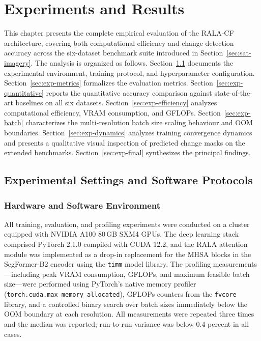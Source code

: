 \chapter{Experiments and Results}
\label{chap:experiments}

This chapter presents the complete empirical evaluation of the \ac{RALA-CF}
architecture, covering both computational efficiency and change detection accuracy
across the six-dataset benchmark suite introduced in Section~\ref{sec:sat-imagery}.
The analysis is organized as follows. Section~\ref{sec:exp-settings} documents the
experimental environment, training protocol, and hyperparameter configuration.
Section~\ref{sec:exp-metrics} formalizes the evaluation metrics.
Section~\ref{sec:exp-quantitative} reports the quantitative accuracy comparison
against state-of-the-art baselines on all six datasets.
Section~\ref{sec:exp-efficiency} analyzes computational efficiency, \ac{VRAM}
consumption, and \ac{GFLOPs}. Section~\ref{sec:exp-batch} characterizes the
multi-resolution batch size scaling behaviour and \ac{OOM} boundaries.
Section~\ref{sec:exp-dynamics} analyzes training convergence dynamics and presents
a qualitative visual inspection of predicted change masks on the extended
benchmarks. Section~\ref{sec:exp-final} synthesizes the principal findings.


\section{Experimental Settings and Software Protocols}
\label{sec:exp-settings}

\subsection{Hardware and Software Environment}

All training, evaluation, and profiling experiments were conducted on a cluster
equipped with NVIDIA A100 80\,GB SXM4 \ac{GPU}s. The deep learning stack comprised
PyTorch 2.1.0 compiled with CUDA 12.2, and the \ac{RALA} attention module was
implemented as a drop-in replacement for the \ac{MHSA} blocks in the SegFormer-B2
encoder using the \texttt{timm} model library. The profiling measurements---including
peak \ac{VRAM} consumption, \ac{GFLOPs}, and maximum feasible batch size---were
performed using PyTorch's native memory profiler
(\texttt{torch.cuda.max\_memory\_allocated}), \ac{GFLOPs} counters from the
\texttt{fvcore} library, and a controlled binary search over batch sizes immediately
below the \ac{OOM} boundary at each resolution. All measurements were repeated three
times and the median was reported; run-to-run variance was below 0.4 percent in all
cases.

